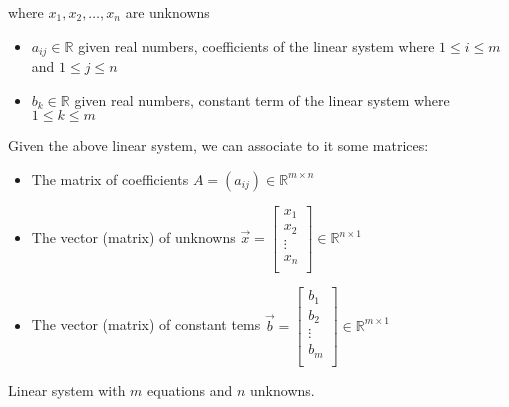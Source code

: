 where $x_1, x_2, \dots, x_n$ are unknowns 
\begin{itemize}
    \item[] $a_{ij}\in \mathbb{R}$ given real numbers, coefficients of the linear system where $1 \le i \le m$ and $1\le j \le n$
    \item[] $b_k \in \mathbb{R}$ given real numbers, constant term of the linear system where $1 \le k \le m$
\end{itemize}
Given the above linear system, we can associate to it some matrices:
\begin{itemize}
    \item[] The matrix of coefficients  $A = (a_{ij}) \in \mathbb{R}^{m\times n}$
    \item[] The vector (matrix) of unknowns $\vec x = \begin{bmatrix}
        x_1\\
        x_2\\
        \vdots\\
        x_n\\
    \end{bmatrix} \in \mathbb{R}^{n\times1}$ 
    \item[] The vector (matrix) of constant tems $\vec b = \begin{bmatrix}
        b_1\\
        b_2\\
        \vdots\\
        b_m\\
    \end{bmatrix} \in \mathbb{R}^{m\times1}$ 
\end{itemize}
Linear system with $m$ equations and $n$ unknowns.

